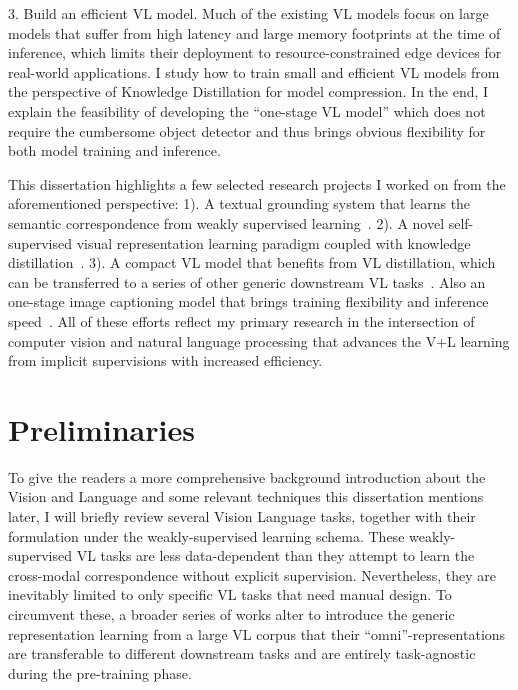 3. Build an efficient VL model. Much of the existing VL models focus on large models that suffer from high latency and large memory footprints at the time of inference, which limits their deployment to resource-constrained edge devices for real-world applications. I study how to train small and efficient VL models from the perspective of Knowledge Distillation for model compression. In the end, I explain the feasibility of developing the ``one-stage VL model'' which does not require the cumbersome object detector and thus brings obvious flexibility for both model training and inference. 

This dissertation highlights a few selected research projects I worked on from the aforementioned perspective: 1). A textual grounding system that learns the semantic correspondence from weakly supervised learning~\citep{Fang_2019_CVPR,fang2019temporal}. 2). A novel self-supervised visual representation learning paradigm coupled with knowledge distillation~\citep{fang2020seed}. 3). A compact VL model that benefits from VL distillation, which can be transferred to a series of other generic downstream VL tasks~\citep{fang2021compressing}. Also an one-stage image captioning model that brings training flexibility and inference speed~\citep{fang2021injecting}. All of these efforts reflect my primary research in the intersection of computer vision and natural language processing that advances the V+L learning from implicit supervisions with increased efficiency.

\section{Preliminaries}
To give the readers a more comprehensive background introduction about the Vision and Language and some relevant techniques this dissertation mentions later, I will briefly review several Vision Language tasks, together with their formulation under the weakly-supervised learning schema. These weakly-supervised VL tasks are less data-dependent than they attempt to learn the cross-modal correspondence without explicit supervision. Nevertheless, they are inevitably limited to only specific VL tasks that need manual design. To circumvent these, a broader series of works alter to introduce the generic representation learning from a large VL corpus that their ``omni''-representations are transferable to different downstream tasks and are entirely task-agnostic during the pre-training phase.

